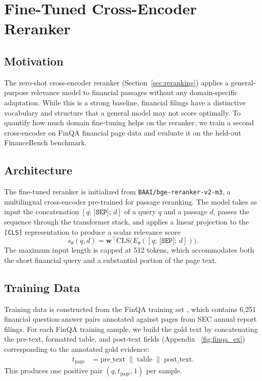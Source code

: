 \documentclass[12pt,twoside,maitrise]{dms}
\theoremstyle{definition}
\numberwithin{equation}{section}
\numberwithin{table}{chapter}
\numberwithin{figure}{chapter}
\begin{document}
\section{Fine-Tuned Cross-Encoder Reranker}
\label{sec:method_ft_reranker}

\subsection{Motivation}

The zero-shot cross-encoder reranker (Section~\ref{sec:reranking}) applies a
general-purpose relevance model to financial passages without any domain-specific
adaptation.  While this is a strong baseline, financial filings have a distinctive
vocabulary and structure that a general model may not score optimally.  To quantify how
much domain fine-tuning helps on the reranker, we train a second cross-encoder on FinQA financial
page data and evaluate it on the held-out FinanceBench benchmark.

\subsection{Architecture}

The fine-tuned reranker is initialized from \texttt{BAAI/bge-reranker-v2-m3}, a
multilingual cross-encoder pre-trained for passage reranking.  The model takes as input
the concatenation $[q;\, \texttt{[SEP]};\, d]$ of a query $q$ and a passage $d$, passes
the sequence through the transformer stack, and applies a linear projection to the
\texttt{[CLS]} representation to produce a scalar relevance score
\begin{equation}
  s_\theta(q, d) = \mathbf{w}^\top \text{CLS}\bigl(E_\theta([q;\, \texttt{[SEP]};\, d])\bigr).
\end{equation}
The maximum input length is capped at 512 tokens, which accommodates both the short
financial query and a substantial portion of the page text.

\subsection{Training Data}

Training data is constructed from the FinQA training set \citep{chen2021finqa}, which
contains 6,251 financial question-answer pairs annotated against pages from SEC annual
report filings.  For each FinQA training sample, we build the gold text
by concatenating the pre-text, formatted table, and post-text fields (Appendix ~\ref{fig:finqa_ex}) corresponding to the
annotated gold evidence:
\begin{align}
  t_{\text{page}} &= \text{pre\_text} \;\|\; \text{table} \;\|\; \text{post\_text}.
\end{align}
This produces one positive pair $(q, t_{\text{page}}, 1)$ per sample.
\end{document}
